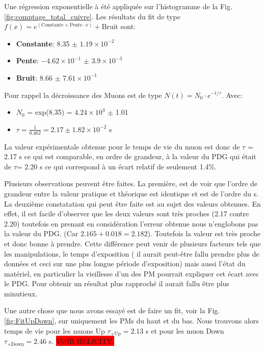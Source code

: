 \documentclass[12pt]{article}
\begin{document}
Une régression exponentielle à été appliquée sur l'histogramme de la Fig. \ref{fig:comptage_total_cuivre}. Les résultats du fit de type $f(x) = e^{(\text{Constante}+\text{Pente}\cdot x)}+\text{Bruit}$ sont:
    \begin{itemize}
        \item \textbf{Constante}: 8.35 $\pm$ $1.19\times10^{-2}$
        \item \textbf{Pente}: $-4.62\times10^{-1}$ $\pm$ $3.9\times10^{-3}$
        \item \textbf{Bruit}: 8.66 $\pm$ $7.61\times10^{-1}$
    \end{itemize}
    
Pour rappel la décroissance des Muons est de type $N(t) = N_{0}\cdot e^{-t/\tau}$. Avec:
    \begin{itemize}
        \item $N_{0}$ = exp(8.35) = $4.24\times10^{3}$ $\pm$ 1.01
        \item $\tau=\frac{1}{0.462} = 2.17 \pm 1.82\times10^{-2}$ \SIUnitSymbolMicro s
    \end{itemize}

La valeur expérimentale obtenue pour le temps de vie du muon est donc de $\tau$ = 2.17 \SIUnitSymbolMicro s ce qui est comparable, en ordre de grandeur, à la valeur du PDG qui était de $\tau$= 2.20 \SIUnitSymbolMicro s ce qui correspond à un écart relatif de seulement 1.4\%.

Plusieurs observations peuvent être faites. La première, est de voir que l'ordre de grandeur entre la valeur pratique et théorique est identique et est de l'ordre du \SIUnitSymbolMicro s. La deuxième constatation qui peut être faite est au sujet des valeurs obtenues. En effet, il est facile d'observer que les deux valeurs sont très proches (2.17 contre 2.20) toutefois en prenant en considération l'erreur obtenue nous n'englobons pas la valeur du PDG. (Car $2.165+0.018=2.182$). Toutefois la valeur est très proche et donc bonne à prendre. Cette différence peut venir de plusieurs facteurs tels que les manipulations, le temps d'exposition ( il aurait peut-être fallu prendre plus de données et ceci sur une plus longue période d'exposition) mais aussi l'état du matériel, en particulier la vieillesse d'un des PM pourrait expliquer cet écart avec le PDG. Pour obtenir un résultat plus rapproché il aurait fallu être plus minutieux. 

Une autre chose que nous avons essayé est de faire un fit, voir la Fig. \ref{fig:FitUpDown}, sur uniquement les PMs du haut et du bas. Nous trouvons alors temps de vie pour les muons Up
$\tau_{+\text{Up}}=2.13$ \SIUnitSymbolMicro s et pour les muon  Down $\tau_{+\text{Down}}=2.46$ \SIUnitSymbolMicro s. \colorbox{red}{VOIR HELICITY.}
\end{document}
